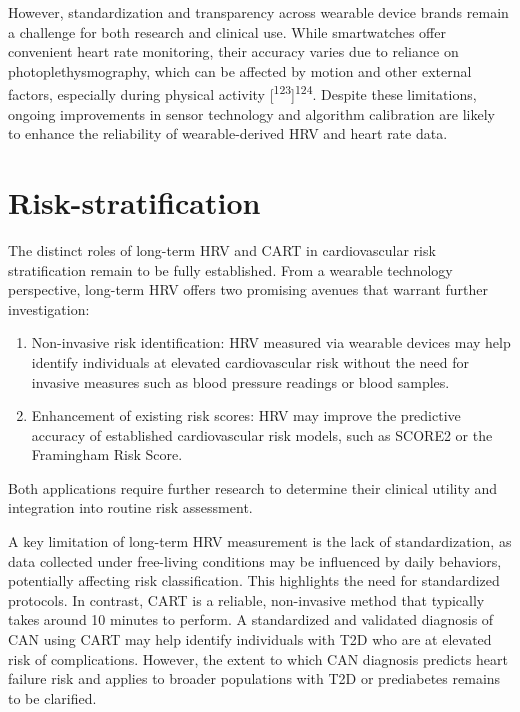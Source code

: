 \documentclass[
  a4paper,
  headsepline=true,
  open=any]{scrbook}
\begin{document}
However, standardization and transparency across wearable device brands
remain a challenge for both research and clinical use. While
smartwatches offer convenient heart rate monitoring, their accuracy
varies due to reliance on photoplethysmography, which can be affected by
motion and other external factors, especially during physical activity
{[}\textsuperscript{123}{]}\textsuperscript{124}. Despite these
limitations, ongoing improvements in sensor technology and algorithm
calibration are likely to enhance the reliability of wearable-derived
HRV and heart rate data.

\hypertarget{risk-stratification-1}{%
\section{Risk-stratification}\label{risk-stratification-1}}

The distinct roles of long-term HRV and CART in cardiovascular risk
stratification remain to be fully established. From a wearable
technology perspective, long-term HRV offers two promising avenues that
warrant further investigation:

\begin{enumerate}
\def\labelenumi{\arabic{enumi}.}
\item
  Non-invasive risk identification: HRV measured via wearable devices
  may help identify individuals at elevated cardiovascular risk without
  the need for invasive measures such as blood pressure readings or
  blood samples.
\item
  Enhancement of existing risk scores: HRV may improve the predictive
  accuracy of established cardiovascular risk models, such as SCORE2 or
  the Framingham Risk Score.
\end{enumerate}

Both applications require further research to determine their clinical
utility and integration into routine risk assessment.

A key limitation of long-term HRV measurement is the lack of
standardization, as data collected under free-living conditions may be
influenced by daily behaviors, potentially affecting risk
classification. This highlights the need for standardized protocols. In
contrast, CART is a reliable, non-invasive method that typically takes
around 10 minutes to perform. A standardized and validated diagnosis of
CAN using CART may help identify individuals with T2D who are at
elevated risk of complications. However, the extent to which CAN
diagnosis predicts heart failure risk and applies to broader populations
with T2D or prediabetes remains to be clarified.
\end{document}
